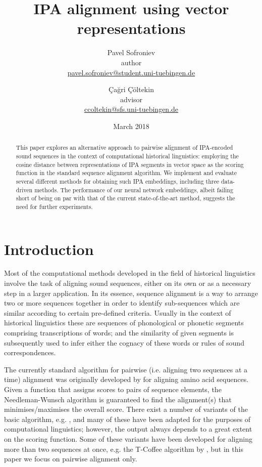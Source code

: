 \documentclass[a4paper]{report}
\begin{document}
\title{IPA alignment using vector representations}
\author{
	Pavel Sofroniev \\ \normalsize{author} \\ \normalsize\url{pavel.sofroniev@student.uni-tuebingen.de}\medskip
	\and
	Çağri Çöltekin \\ \normalsize{advisor} \\ \normalsize\url{ccoltekin@sfs.uni-tuebingen.de}\bigskip
}
\date{March 2018}
\maketitle

\begin{abstract}
	This paper explores an alternative approach to pairwise alignment of IPA-encoded sound sequences in the context of computational historical linguistics:
	employing the cosine distance between representations of IPA segments in vector space as the scoring function in the standard sequence alignment algorithm.
	We implement and evaluate several different methods for obtaining such IPA embeddings, including three data-driven methods.
	The performance of our neural network embeddings, albeit failing short of being on par with that of the current state-of-the-art method,
	suggests the need for further experiments.
\end{abstract}


\chapter{Introduction}

Most of the computational methods developed in the field of historical linguistics involve the task of aligning sound sequences,
either on its own or as a necessary step in a larger application.
In its essence, sequence alignment is a way to arrange two or more sequences together
in order to identify sub-sequences which are similar according to certain pre-defined criteria.
Usually in the context of historical linguistics these are sequences of phonological or phonetic segments comprising transcriptions of words;
and the similarity of given segments is subsequently used to infer either the cognacy of these words or rules of sound correspondences.

The currently standard algorithm for pairwise (i.e. aligning two sequences at a time) alignment
was originally developed by \citet{1970_Needleman_Wunsch} for aligning amino acid sequences.
Given a function that assigns scores to pairs of sequence elements,
the Needleman-Wunsch algorithm is guaranteed to find the alignment(s) that minimises/maximises the overall score.
There exist a number of variants of the basic algorithm, e.g. \citet{1981_Smith_Waterman},
and many of these have been adapted for the purposes of computational linguistics;
however, the output always depends to a great extent on the scoring function.
Some of these variants have been developed for aligning more than two sequences at once,
e.g. the T-Coffee algorithm by \citet{2000_Notredame_al}, but in this paper we focus on pairwise alignment only.
\end{document}
